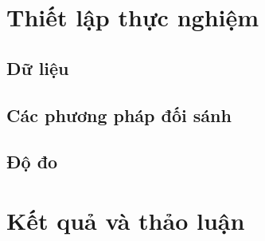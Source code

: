 \documentclass[10pt, conference, a4paper, compsocconf]{IEEEtran}
\begin{document}
\section{Thiết lập thực nghiệm}

\subsection{Dữ liệu}

\subsection{Các phương pháp đối sánh}

\subsection{Độ đo}

\section{Kết quả và thảo luận}

\end{document}
